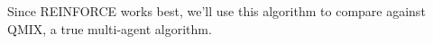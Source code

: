 Since REINFORCE works best, we'll use this algorithm to compare against QMIX, a true multi-agent algorithm.

